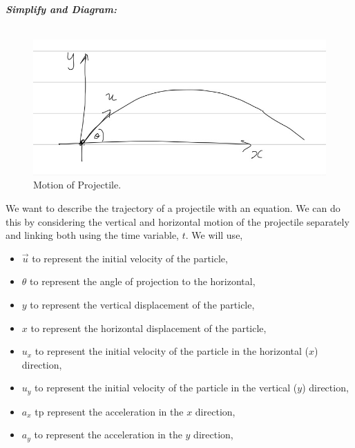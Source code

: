 %
%
%


\begin{subquestions}
	
\subquestion

\textbf{\textit{Simplify and Diagram:}} \\ \\
\begin{figure}[H]
	\begin{center}
		\includegraphics[scale=0.25]{../2014/figures/2014q6-1}
		\caption{\label{2014:q6:Diagram1} Motion of Projectile.}
	\end{center}
\end{figure}
We want to describe the trajectory of a projectile with an equation. We can do this by considering the vertical and horizontal motion of the projectile separately and linking both using the time variable, $t$. We will use,
\begin{itemize}
	\item $\vec{u}$ to represent the initial velocity of the particle,
	\item $\theta$ to represent the angle of projection to the horizontal,
	\item $y$ to represent the vertical displacement of the particle,
	\item $x$ to represent the horizontal displacement of the particle,
	\item $u_x$ to represent the initial velocity of the particle in the horizontal ($x$) direction,
	\item $u_y$ to represent the initial velocity of the particle in the vertical ($y$) direction,
	\item $a_x$ tp represent the acceleration in the $x$ direction,
	\item $a_y$ to represent the acceleration in the $y$ direction,
\end{itemize}  
	

\end{subquestions}
